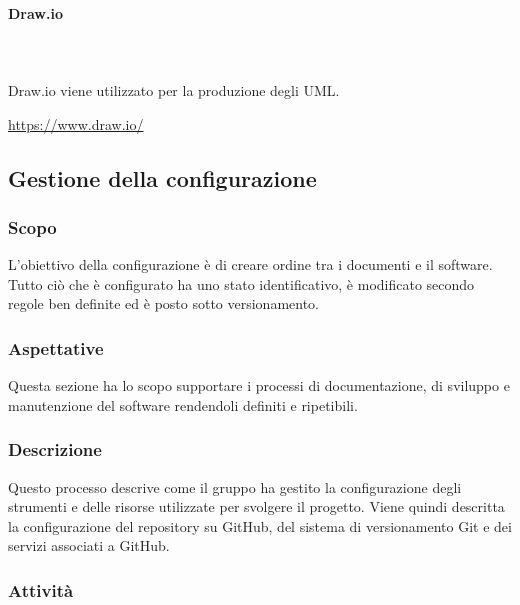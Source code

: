 \paragraph{Draw.io}\mbox{} \\ \mbox{} \\
Draw.io viene utilizzato per la produzione degli UML.\\
\centerline{\url{https://www.draw.io/}} 

\subsection{Gestione della configurazione}
\subsubsection{Scopo}
L'obiettivo della configurazione è di creare ordine tra i documenti e il software. Tutto ciò che è configurato ha uno stato identificativo, è modificato secondo regole ben definite ed è posto sotto versionamento\glo.

\subsubsection{Aspettative}
Questa sezione ha lo scopo supportare i processi di documentazione, di sviluppo e manutenzione del software rendendoli definiti e ripetibili.

\subsubsection{Descrizione}
Questo processo descrive come il gruppo ha gestito la configurazione degli strumenti e delle risorse utilizzate per svolgere il progetto. Viene quindi descritta la configurazione del repository su GitHub, del sistema di versionamento Git e dei servizi associati a GitHub.

\subsubsection{Attività}

